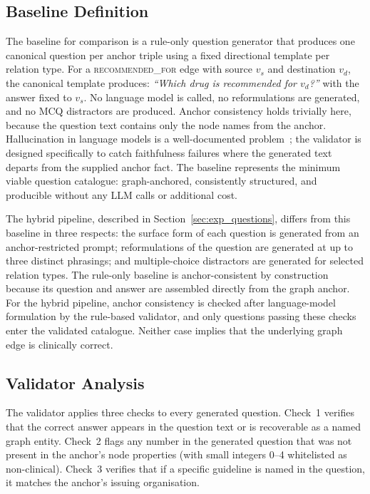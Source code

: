 \subsection{Baseline Definition}
\label{sec:exp_quality-baseline}

The baseline for comparison is a rule-only question generator that produces
one canonical question per anchor triple using a fixed directional template
per relation type. For a \textsc{recommended\_for} edge with source $v_s$ and
destination $v_d$, the canonical template produces: \textit{``Which drug is
recommended for $v_d$?''} with the answer fixed to $v_s$. No language model
is called, no reformulations are generated, and no MCQ distractors are
produced. Anchor consistency holds trivially here, because the question text
contains only the node names from the anchor. Hallucination in language
models is a well-documented problem~\cite{huang2025}; the validator is
designed specifically to catch faithfulness failures where the generated
text departs from the supplied anchor fact. The baseline represents the
minimum viable question catalogue: graph-anchored, consistently
structured, and producible without any LLM calls or additional cost.

The hybrid pipeline, described in Section~\ref{sec:exp_questions}, differs
from this baseline in three respects: the surface form of each question is
generated from an anchor-restricted prompt; reformulations
of the question are generated at up to three distinct phrasings; and
multiple-choice distractors are generated for selected relation types. The rule-only baseline is anchor-consistent by construction because its question and answer are assembled directly from the graph anchor. For the hybrid pipeline, anchor consistency is checked after language-model formulation by the rule-based validator, and only questions passing these checks enter the validated catalogue. Neither case implies that the underlying graph edge is clinically correct.

\subsection{Validator Analysis}
\label{sec:validator-analysis}

The validator applies three checks to every generated question. Check~1
verifies that the correct answer appears in the question text or is
recoverable as a named graph entity. Check~2 flags any number in the
generated question that was not present in the anchor's node properties
(with small integers 0--4 whitelisted as non-clinical). Check~3 verifies
that if a specific guideline is named in the question, it matches the anchor's
issuing organisation.

